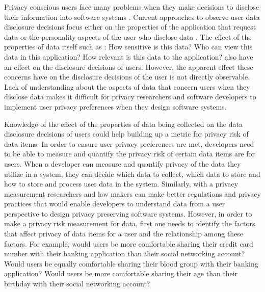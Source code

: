 \documentclass[conference]{IEEEtran}
\begin{document}
Privacy conscious users face many problems when they make decisions to disclose their information into software systems \cite {li2010understanding}. Current approaches to observe user data disclosure decisions focus either on the properties of the application that request data \cite {li2010understanding, wang2016context, malheiros2013fairly} or the personality aspects of the user who disclose data \cite {nissenbaum2009privacy}. The effect of the properties of data itself such as : How sensitive is this data? Who can view this data in this application? How relevant is this data to the application? also have an effect on the disclosure decisions of users. However, the apparent effect these concerns have on the disclosure decisions of the user is not directly observable. Lack of understanding about the aspects of data that concern users when they disclose data makes it difficult for privacy researchers and software developers to implement user privacy preferences when they design software systems. 

Knowledge of the effect of the properties of data being collected on the data disclosure decisions of users could help building up a metric for privacy risk of data items. In order to ensure user privacy preferences are met, developers need to be able to measure and quantify the privacy risk of certain data items are for users. When a developer can measure and quantify privacy of the data they utilize in a system, they can decide which data to collect, which data to store and how to store and process user data in the system. Similarly, with a privacy measurement researchers and law makers can make better regulations and privacy practices that would enable developers to understand data from a user perspective to design privacy preserving software systems. However, in order to make a privacy risk measurement for data, first one needs to identify the factors that affect privacy of data items for a user and the relationship among these factors. For example, would users be more comfortable sharing their credit card number with their banking application than their social networking account? Would users be equally comfortable sharing their blood group with their banking application? Would users be more comfortable sharing their age than their birthday with their social networking account? 
\end{document}
